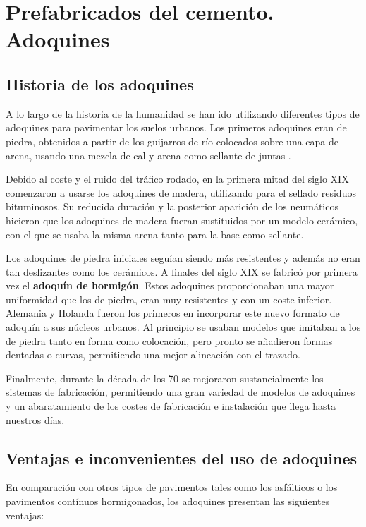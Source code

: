 \section{Prefabricados del cemento. Adoquines}

\subsection{Historia de los adoquines}
A lo largo de la historia de la humanidad se han ido utilizando diferentes tipos de adoquines para pavimentar los suelos urbanos. Los primeros adoquines eran de piedra, obtenidos a partir de los guijarros de río colocados sobre una capa de arena, usando una mezcla de cal y arena como sellante de juntas  \cite{euroadoquin}.

Debido al coste y el ruido del tráfico rodado, en la primera mitad del siglo XIX comenzaron a usarse los adoquines de madera, utilizando para el sellado residuos bituminosos. Su reducida duración y la posterior aparición de los neumáticos hicieron que los adoquines de madera fueran sustituidos por un modelo cerámico, con el que se usaba la misma arena tanto para la base como sellante.

Los adoquines de piedra iniciales seguían siendo más resistentes y además no eran tan deslizantes como los cerámicos. A finales del siglo XIX se fabricó por primera vez el \textbf{adoquín de hormigón}. Estos adoquines proporcionaban una mayor uniformidad que los de piedra, eran muy resistentes y con un coste inferior. Alemania y Holanda fueron los primeros en incorporar este nuevo formato de adoquín a sus núcleos urbanos. Al principio se usaban modelos que imitaban a los de piedra tanto en forma como colocación, pero pronto se añadieron formas dentadas o curvas, permitiendo una mejor alineación con el trazado.

Finalmente, durante la década de los 70 se mejoraron sustancialmente los sistemas de fabricación, permitiendo una gran variedad de modelos de adoquines y un abaratamiento de los costes de fabricación e instalación que llega hasta nuestros días.

\subsection{Ventajas e inconvenientes del uso de adoquines}\label{sec:ventajas}

En comparación con otros tipos de pavimentos tales como los asfálticos o los pavimentos contínuos hormigonados, los adoquines presentan las siguientes ventajas:

